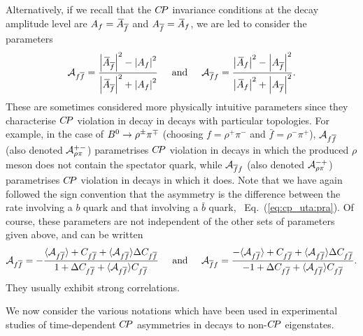 Alternatively, if we recall that the $C\!P$ invariance
conditions at the decay amplitude level are
$\Af = \Abarfbar$ and $\Afbar = \Abarf$,
we are led to consider the parameters~\cite{Charles:2004jd}
\begin{equation}
  \label{eq:cp_uta:non-cp-directcp}
  {\cal A}_{f\bar{f}} = 
  \frac{
    \left| \Abarfbar \right|^2 - \left| \Af \right|^2 
  }{
    \left| \Abarfbar \right|^2 + \left| \Af \right|^2
  }
  \hspace{5mm}
  {\rm and}
  \hspace{5mm}
  {\cal A}_{\bar{f}f} = 
  \frac{
    \left| \Abarf \right|^2 - \left| \Afbar \right|^2
  }{
    \left| \Abarf \right|^2 + \left| \Afbar \right|^2
  }.
\end{equation}
These are sometimes considered more physically intuitive parameters
since they characterise $C\!P$ violation in decay
in decays with particular topologies.
For example, in the case of $B^0 \to \rho^\pm\pi^\mp$
(choosing $f =  \rho^+\pi^-$ and $\bar{f} = \rho^-\pi^+$),
${\cal A}_{f\bar{f}}$ (also denoted ${\cal A}^{+-}_{\rho\pi}$)
parametrises $C\!P$ violation
in decays in which the produced $\rho$ meson does not contain the 
spectator quark,
while ${\cal A}_{\bar{f}f}$ (also denoted ${\cal A}^{-+}_{\rho\pi}$)
parametrises $C\!P$ violation in decays in which it does.
Note that we have again followed the sign convention that the asymmetry 
is the difference between the rate involving a $b$ quark and that
involving a $\bar{b}$ quark, \cf\ Eq.~(\ref{eq:cp_uta:pra}). 
Of course, these parameters are not independent of the 
other sets of parameters given above, and can be written
\begin{equation}
  {\cal A}_{f\bar{f}} =
  - \frac{
    \Adirnoncp + C_{f\bar{f}} + \Adirnoncp \Delta C_{f\bar{f}} 
  }{
    1 + \Delta C_{f\bar{f}} + \Adirnoncp C_{f\bar{f}} 
  }
  \hspace{5mm}
  {\rm and}
  \hspace{5mm}
  {\cal A}_{\bar{f}f} =
  \frac{
    - \Adirnoncp + C_{f\bar{f}} + \Adirnoncp \Delta C_{f\bar{f}} 
  }{
    - 1 + \Delta C_{f\bar{f}} + \Adirnoncp C_{f\bar{f}}  
  }.
\end{equation}
They usually exhibit strong correlations.

We now consider the various notations which have been used 
in experimental studies of
time-dependent $C\!P$ asymmetries in decays to non-$C\!P$ eigenstates.

\label{sec:cp_uta:notations:non_cp:dstard}

